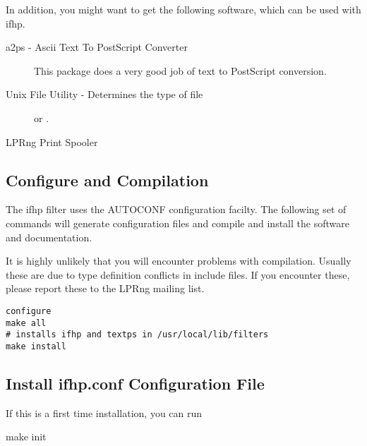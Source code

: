 \documentclass[a4paper]{article}
\begin{document}
In addition, you might want to get the following software,
which can be used with
{\ttfamily ifhp}.
\begin{description}
\item[a2ps - Ascii Text To PostScript Converter] \mbox{}

This package does a very good job of text to PostScript conversion.

\item[Unix File Utility - Determines the type of file] \mbox{}

 or
.

\item[LPRng Print Spooler] \mbox{}


\end{description}



\subsection{Configure and Compilation}

The {\ttfamily ifhp} filter uses the AUTOCONF configuration facilty.
The following set of commands will generate configuration files
and compile and install the software and documentation.

It is highly unlikely that you will encounter problems with compilation.
Usually these are due to type definition conflicts in include files.
If you encounter these,
please report these to the LPRng mailing list.
\begin{tscreen}
\begin{verbatim}
configure
make all
# installs ifhp and textps in /usr/local/lib/filters
make install
\end{verbatim}
\end{tscreen}



\subsection{Install ifhp.conf Configuration File}

If this is a first time installation,
you can run
\begin{tscreen}
make init
\end{tscreen}
\end{document}
